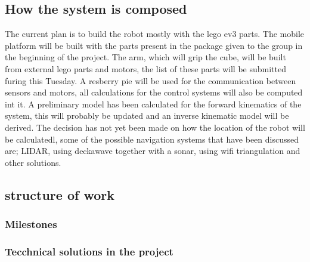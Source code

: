 \documentclass[twocolumn]{article}
\begin{document}
\subsection{How the system is composed}
The current plan is to build the robot mostly with the lego ev3 parts. The mobile platform will be built with the parts present in the package given to the group in the beginning of the project. The arm, which will grip the cube, will be built from external lego parts and motors, the list of these parts will be submitted furing this Tuesday. A resberry pie will be used for the communication between sensors and motors, all calculations for the control systems will also be computed int it. A preliminary model has been calculated for the forward kinematics of the system, this will probably be updated and an inverse kinematic model will be derived. The decision has not yet been made on how the location of the robot will be calculatedl, some of the possible navigation systems that have been discussed are; LIDAR, using deckawave together with a sonar, using wifi triangulation and other solutions. 

\subsection{structure of work}
\subsubsection{Milestones}
\subsubsection{Tecchnical solutions in the project}
\end{document}
